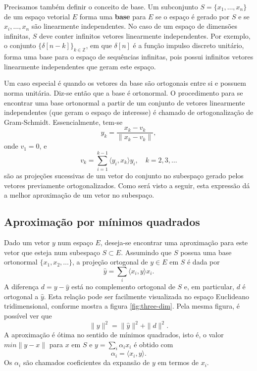 Precisamos também definir o conceito de base. Um subconjunto $S=\{x_1,\ldots,x_n\}$ de um espaço vetorial $E$ forma uma \textbf{base} para $E$ se o espaço é gerado por $S$ e se $x_i,\ldots,x_n$ são linearmente independentes. No caso de um espaço de dimensões infinitas, $S$ deve conter infinitos vetores linearmente independentes. Por exemplo, o conjunto $\{\delta[n-k]\}_{k\in\mathbb{Z}}$, em que $\delta[n]$ é a função impulso discreto unitário, forma uma base para o espaço de sequências infinitas, pois possui infinitos vetores linearmente independentes que geram este espaço.

Um caso especial é quando os vetores da base são ortogonais entre si e possuem norma unitária. Diz-se então que a base é ortonormal. O procedimento para se encontrar uma base ortonormal a partir de um conjunto de vetores linearmente independentes (que geram o espaço de interesse) é chamado de ortogonalização de Gram-Schmidt. Essencialmente, tem-se
\begin{equation}
    y_k = \frac{x_k-v_k}{\|x_k-v_k\|},
\end{equation}
onde $v_1 = 0$, e
\begin{equation}
    v_k = \sum_{i=1}^{k-1} \langle y_i,x_k\rangle y_i,\quad k=2,3,\ldots
\end{equation}
são as projeções sucessivas de um vetor do conjunto no subespaço gerado pelos vetores previamente ortogonalizados. Como será visto a seguir, esta expressão dá a melhor aproximação de um vetor no subespaço.


\subsection*{Aproximação por mínimos quadrados}

Dado um vetor $y$ num espaço $E$, deseja-se encontrar uma aproximação para este vetor que esteja num subespaço $S \subset E$. Assumindo que $S$ possua uma base ortonormal $\{x_1,x_2,\ldots\}$, a projeção ortogonal de $y \in E$ em $S$ é dada por
\begin{equation}
    \hat{y} = \sum_{i} \langle x_i,y\rangle x_i.
\end{equation}
A diferença $d=y-\hat{y}$ está no complemento ortogonal de $S$ e, em particular, $d$ é ortogonal a $\hat{y}$. Esta relação pode ser facilmente visualizada no espaço Euclideano tridimensional, conforme mostra a figura \ref{fig:three-dim}. Pela mesma figura, é possível ver que
\begin{equation}
    \|y\|^2 = \|\hat{y}\|^2+\|d\|^2.
\end{equation}
A aproximação é ótima no sentido de mínimos quadrados, isto é, o valor $min\|y-x\|$ para $x$ em $S$ e $y=\sum_{i} \alpha_ix_i$ é obtido com
\begin{equation}
    \alpha_i = \langle x_i,y\rangle.
\end{equation}
Os $\alpha_i$ são chamados coeficientes da expansão de $y$ em termos de $x_i$.

